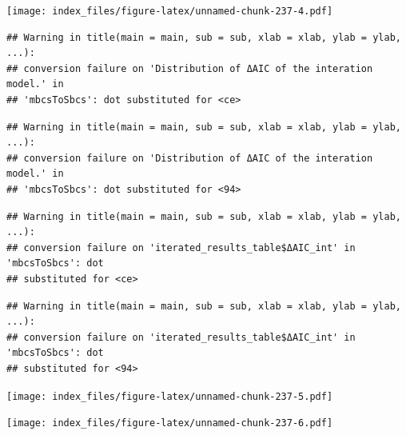 \documentclass[
]{article}
\newenvironment{Shaded}{\begin{snugshade}}{\end{snugshade}}
\newcommand{\AttributeTok}[1]{\textcolor[rgb]{0.77,0.63,0.00}{#1}}
\newcommand{\FunctionTok}[1]{\textcolor[rgb]{0.00,0.00,0.00}{#1}}
\newcommand{\NormalTok}[1]{#1}
\newcommand{\SpecialCharTok}[1]{\textcolor[rgb]{0.00,0.00,0.00}{#1}}
\newcommand{\StringTok}[1]{\textcolor[rgb]{0.31,0.60,0.02}{#1}}
\begin{document}
\texttt{[image: index\_files/figure-latex/unnamed-chunk-237-4.pdf]}

\begin{Shaded}
\end{Shaded}

\begin{verbatim}
## Warning in title(main = main, sub = sub, xlab = xlab, ylab = ylab, ...):
## conversion failure on 'Distribution of ΔAIC of the interation model.' in
## 'mbcsToSbcs': dot substituted for <ce>
\end{verbatim}

\begin{verbatim}
## Warning in title(main = main, sub = sub, xlab = xlab, ylab = ylab, ...):
## conversion failure on 'Distribution of ΔAIC of the interation model.' in
## 'mbcsToSbcs': dot substituted for <94>
\end{verbatim}

\begin{verbatim}
## Warning in title(main = main, sub = sub, xlab = xlab, ylab = ylab, ...):
## conversion failure on 'iterated_results_table$ΔAIC_int' in 'mbcsToSbcs': dot
## substituted for <ce>
\end{verbatim}

\begin{verbatim}
## Warning in title(main = main, sub = sub, xlab = xlab, ylab = ylab, ...):
## conversion failure on 'iterated_results_table$ΔAIC_int' in 'mbcsToSbcs': dot
## substituted for <94>
\end{verbatim}

\texttt{[image: index\_files/figure-latex/unnamed-chunk-237-5.pdf]}

\begin{Shaded}
\end{Shaded}

\texttt{[image: index\_files/figure-latex/unnamed-chunk-237-6.pdf]}
\end{document}
